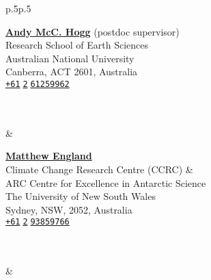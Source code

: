 \documentclass[10pt, letter]{article}
\begin{document}
\begin{tabular}{p{}p{}}
\begin{minipage}[c]{.55\textwidth}
\raggedright \href{https://scholar.google.com/citations?hl=en&user=7LMFoPMAAAAJ}{\color{black}\textbf{Andy McC. Hogg}} (postdoc supervisor)\\
Research School of Earth Sciences\\
Australian National University\\
Canberra, ACT 2601, Australia\\
{}\hspace{.188cm}\texttt{\href{skype:+61261259962?sms}{+61$\;$2$\;$61259962}}\\
\hspace{-.1em}\\
\hspace{.1em}{w}\\
\mbox{}\end{minipage}%
&
\begin{minipage}[c]{.48\textwidth}
\raggedright \href{https://scholar.google.com/citations?hl=en&user=GfIm7WQAAAAJ}{\color{black}\textbf{Matthew England}}\\
Climate Change Research Centre (CCRC) \& \\
\hspace*{1em} ARC Centre for Excellence in Antarctic Science\\
The University of New South Wales\\
Sydney, NSW, 2052, Australia\\
{}\hspace{.188cm}\texttt{\href{skype:+61293859766?sms}{+61$\;$2$\;$93859766}}\\
\hspace{-.1em}\\
\hspace{.1em}{w}\end{minipage}\\
\mbox{}&\\

\end{tabular}
\end{document}
